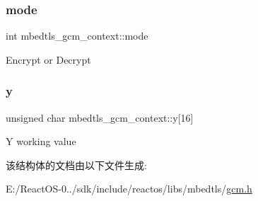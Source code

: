 \subsubsection{\texorpdfstring{mode}{mode}}
{\footnotesize\ttfamily int mbedtls\+\_\+gcm\+\_\+context\+::mode}

Encrypt or Decrypt \mbox{\label{structmbedtls__gcm__context_a1a7eb48ed5911aeb2dd983da6cfd32bb}} 
\subsubsection{\texorpdfstring{y}{y}}
{\footnotesize\ttfamily unsigned char mbedtls\+\_\+gcm\+\_\+context\+::y\mbox{[}16\mbox{]}}

Y working value 

该结构体的文档由以下文件生成\+:\begin{DoxyCompactItemize}
\item 
E\+:/\+React\+O\+S-\/0../sdk/include/reactos/libs/mbedtls/\hyperlink{gcm_8h}{gcm.\+h}\end{DoxyCompactItemize}
